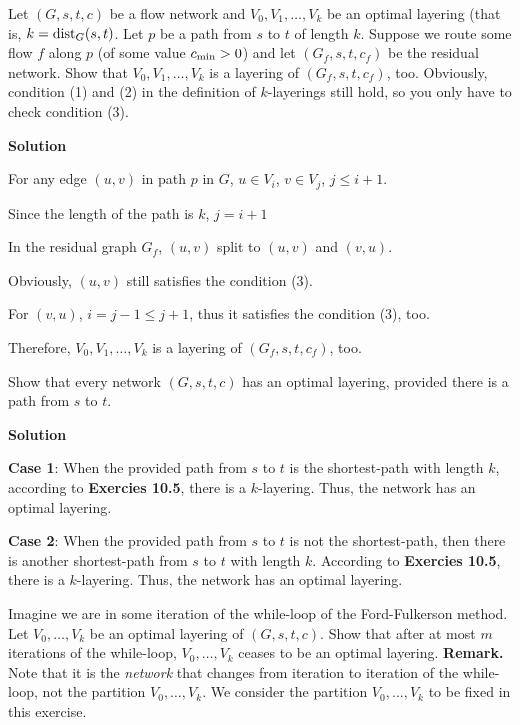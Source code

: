 
\begin{exercise}
   Let $(G,s,t,c)$ be a flow network and $V_0, V_1, \dots, V_k$ be an optimal layering
   (that is, $k = {\rm dist}_G(s,t)$.
   Let $p$ be a path from $s$ to $t$ of length $k$. 
   Suppose we route some flow $f$ along $p$ (of some
   value $c_{\rm min} > 0$) and let $(G_f,s,t,c_f)$ be the residual network. Show that
   $V_0, V_1,\dots, V_k$ is a layering of $(G_f,s,t,c_f)$, too. Obviously, condition (1) and (2) in
   the definition of $k$-layerings still hold, so you only have to check  condition (3).
\end{exercise}

\textbf{Solution}

For any edge $(u,v)$ in path $p$ in $G$, $u \in V_i$, $v \in V_j$, $j \leq i + 1$.

Since the length of the path is $k$, $j = i + 1$

In the residual graph $G_f$, $(u,v)$ split to $(u,v)$ and $(v,u)$.

Obviously, $(u,v)$ still satisfies the condition (3).

For $(v,u)$, $i = j-1 \leq j+1$, thus it satisfies the condition (3), too.

Therefore, $V_0, V_1, \dots, V_k$ is a layering of $(G_f, s, t, c_f)$, too.


\begin{exercise}
   Show that every network $(G,s,t,c)$ has an optimal layering, provided there is a path
   from $s$ to $t$.
\end{exercise}

\textbf{Solution}

\textbf{Case 1}: When the provided path from $s$ to $t$ is the shortest-path with length $k$, according to \textbf{Exercies 10.5}, there is a $k$-layering. Thus, the network has an optimal layering.

\textbf{Case 2}: When the provided path from $s$ to $t$ is not the shortest-path, then there is another shortest-path from $s$ to $t$ with length $k$. According to \textbf{Exercies 10.5}, there is a $k$-layering. Thus, the network has an optimal layering.


\begin{exercise}
   Imagine we are in some iteration of the while-loop of the Ford-Fulkerson method.
   Let $V_0, \dots, V_k$ be an optimal layering of $(G,s,t,c)$. Show that after at most $m$
   iterations of the while-loop, $V_0,\dots,V_k$ ceases
   to be an optimal layering. \textbf{Remark.} Note that it is the {\em network} that changes from
   iteration to iteration of the while-loop, not the partition $V_0,\dots,V_k$. We consider
   the partition $V_0,\dots,V_k$ to be fixed in this exercise.
\end{exercise}

